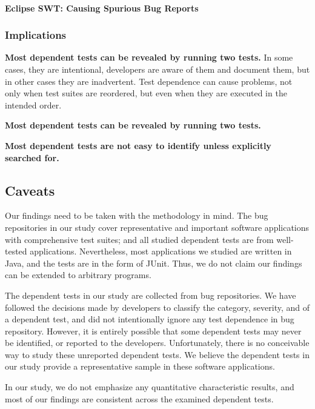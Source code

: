 \paragraph{Eclipse SWT: Causing Spurious Bug Reports}



\subsubsection{Implications}

\vspace{1mm}
\noindent \textbf{Most dependent tests can be revealed by running two tests.}
In some cases, they are intentional, developers are aware
of them and document them, but in other cases they are
inadvertent. Test dependence can cause problems, not only
when test suites are reordered, but even when they are
executed in the intended order.

\vspace{1mm}
\noindent \textbf{Most dependent tests can be revealed by running two tests.}

\vspace{1mm}
\noindent \textbf{Most dependent tests are not easy to identify unless explicitly searched for.}

\subsection{Caveats}

Our findings need to be taken with the methodology in mind. The
bug repositories in our study cover representative and important
software applications with comprehensive test suites; and
all studied dependent tests are from well-tested
applications. Nevertheless, most applications we studied
are written in Java, and the tests are in the form of JUnit.
Thus, we do not claim our findings can be extended to
arbitrary programs.

The dependent tests in our study are collected from bug
repositories. We have followed the decisions made by
developers to classify the category, severity, and
 of a dependent test,
and did not intentionally ignore
any test dependence in bug repository. However,
it is entirely possible that some dependent tests may never
be identified, or reported to the developers. Unfortunately,
there is no conceivable way to study these unreported
dependent tests. We believe the dependent tests in our study
provide a representative sample in these software applications.

In our study, we do not emphasize any quantitative characteristic
results, and most of our findings are consistent across
the examined dependent tests.
